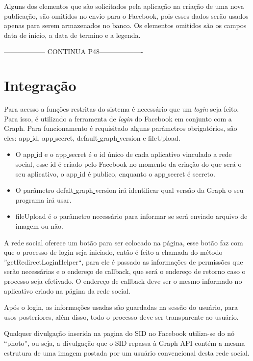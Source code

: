 Alguns dos elementos que são solicitados pela aplicação na criação de uma nova publicação, são omitidos no envio para o Facebook, pois esses dados serão usados apenas para serem armazenados no banco. Os elementos omitidos são os campos data de inicio, a data de termino e a legenda. 

------------------ CONTINUA  P48-------------------

\section{Integração}
Para acesso a funções restritas do sistema é necessário que um \textit{login} seja feito. Para isso, é utilizado a ferramenta de \textit{login} do Facebook em conjunto com a Graph. Para funcionamento é requisitado alguns parâmetros obrigatórios, são eles: app\underline{{ }}id, app\underline{{ }}secret, default\underline{{ }}graph\underline{{ }}version e fileUpload.

\begin{itemize}
\item O app\underline{{ }}id e o app\underline{{ }}secret é o id único de cada aplicativo vinculado a rede social, esse id é criado pelo Facebook no momento da criação do que será o seu aplicativo, o app\underline{{ }}id é publico, enquanto o app\underline{{ }}secret é secreto.

\item O parâmetro defalt\underline{{ }}graph\underline{{ }}version irá identificar qual versão da Graph o seu programa irá usar.

\item fileUpload é o parâmetro necessário para informar se será enviado arquivo de imagem ou não.
\end{itemize}

A rede social oferece um botão para ser colocado na página, esse botão faz com que o processo de login seja iniciado, então é feito a chamada do método ''getRedirectLoginHelper``, para ele é passado as informações de permissões que serão necessárias e o endereço de callback, que será o endereço de retorno caso o processo seja efetivado. O endereço de callback deve ser o mesmo informado no aplicativo criado na página da rede social.

Após o login, as informações usadas são guardadas na sessão do usuário, para usos posteriores, além disso, todo o processo deve ser transparente ao usuário. 

Qualquer divulgação inserida na pagina do SID no Facebook utiliza-se do nó “photo”, ou seja, a divulgação que o SID repassa à Graph API contém a mesma estrutura de uma imagem postada por um usuário convencional desta rede social. 

